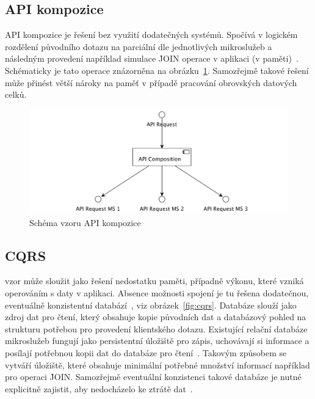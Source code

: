 \subsection{API kompozice}\label{subsec:msa-db-aggregate-api}

API kompozice je řešení bez využití dodatečných systémů.
Spočívá v logickém rozdělení původního dotazu na parciální dle jednotlivých mikroslužeb a následným provedení například simulace \h{JOIN} operace v aplikaci (v paměti)~\cite{apicomposition}.
Schématicky je tato operace znázorněna na obrázku~\ref{fig:api-composition}.
Samozřejmě takové řešení může přinést větší nároky na paměť v případě pracování obrovských datových celků.


\begin{figure}[htbp]
   \centering
   \includegraphics[max width=\textwidth]{assets/api-composition}
   \caption{Schéma vzoru API kompozice}\label{fig:api-composition}
\end{figure}



\subsection{CQRS}\label{subsec:msa-db-aggregate-cqrs}

 vzor může sloužit jako řešení nedostatku paměti, případně výkonu, které vzniká operováním s daty v aplikaci.
Absence možnosti spojení je tu řešena dodatečnou, eventuálně konzistentní databází~\cite{msachris}, viz obrázek~\ref{fig:cqrs}.
Databáze slouží jako zdroj dat pro čtení, který obsahuje kopie původních dat a databázový pohled na strukturu potřebou pro provedení klientského dotazu.
Existující relační databáze mikroslužeb fungují jako persistentní úložiště pro zápis, uchovávají si informace a posílají potřebnou kopii dat do databáze pro čtení~\cite{cqrs}.
Takovým způsobem se vytváří úložiště, které obsahuje minimální potřebné množství informací například pro operaci \h{JOIN}.
Samozřejmě eventuální konzistenci takové databáze je nutné explicitně zajistit, aby nedocházelo ke ztrátě dat~\cite{cqrs}.



